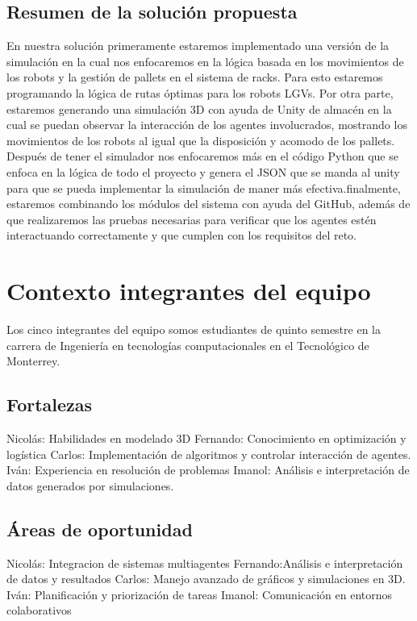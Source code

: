 \documentclass[sjournal]{IEEEtran}
\begin{document}
\subsection{Resumen de la solución propuesta}
En nuestra solución primeramente estaremos implementado una versión de la simulación en la cual nos enfocaremos en la lógica basada en los movimientos de los robots y la gestión de pallets en el sistema de racks. Para esto estaremos programando la lógica de rutas óptimas para los robots LGVs. Por otra parte, estaremos generando una simulación 3D con ayuda de Unity de almacén en la cual se puedan observar la interacción de los agentes involucrados, mostrando los movimientos de los robots al igual que la disposición y acomodo de los pallets. Después de tener el simulador nos enfocaremos más en el código Python que se enfoca en la lógica de todo el proyecto y genera el JSON que se manda al unity para que se pueda implementar la simulación de maner más efectiva.finalmente, estaremos combinando los módulos del sistema con ayuda del GitHub, además de que  realizaremos las pruebas necesarias para verificar que los agentes estén interactuando correctamente y que cumplen con los requisitos del reto. 

\section{Contexto integrantes del equipo}
Los cinco integrantes del equipo somos estudiantes de quinto semestre en la carrera de Ingeniería en tecnologías computacionales en el Tecnológico de Monterrey. 

\subsection{Fortalezas}
Nicolás: Habilidades en modelado 3D
Fernando: Conocimiento en optimización y logística
Carlos: Implementación de algoritmos y controlar interacción de agentes.
Iván: Experiencia en resolución de problemas
Imanol: Análisis e interpretación de datos generados por simulaciones.

\subsection{Áreas de oportunidad}
Nicolás: Integracion de sistemas multiagentes
Fernando:Análisis e interpretación de datos y resultados
Carlos: Manejo avanzado de gráficos y simulaciones en 3D.
Iván: Planificación y priorización de tareas
Imanol: Comunicación en entornos colaborativos
\end{document}
